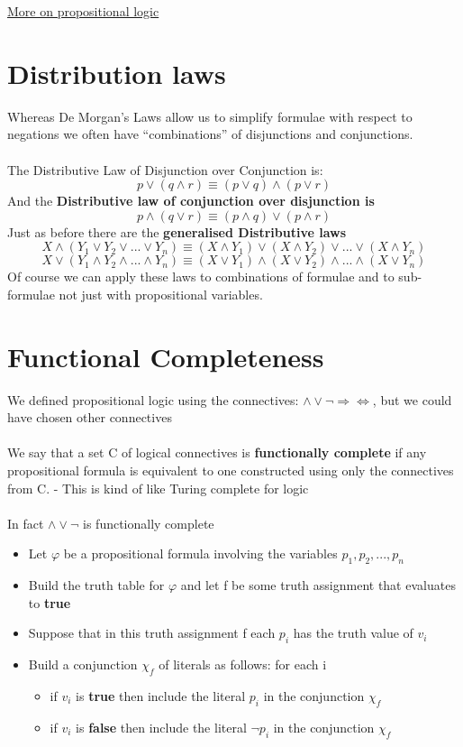 \documentclass{article}[18pt]
\begin{document}
\begin{center}
\underline{\huge More on propositional logic}
\end{center}
\section{Distribution laws}
Whereas De Morgan’s Laws allow us to simplify formulae with respect to negations we often have “combinations” of disjunctions and conjunctions.\\
\\
The Distributive Law of Disjunction over Conjunction is:\\
$$p\lor (q\land r)\equiv (p\lor q)\land (p\lor r)$$
And the \textbf{Distributive law of conjunction over disjunction is}
$$p\land(q\lor r)\equiv (p\land q)\lor (p\land r)$$
Just as before there are the \textbf{generalised Distributive laws}
$$X\land(Y_1\lor Y_2 \lor ... \lor Y_n)\equiv (X\land Y_1)\lor (X\land Y_2)\lor ... \lor (X\land Y_n)$$
$$X\lor (Y_1\land Y_2 \land ...\land Y_n)\equiv (X\lor Y_1)\land (X\lor Y_2)\land ... \land (X\lor Y_n)$$
Of course we can apply these laws to combinations of formulae and to sub-formulae not just with propositional variables. 
\section{Functional Completeness}
We defined propositional logic using the connectives: $\land \lor \lnot \Rightarrow \Leftrightarrow$, but we could have chosen other connectives\\
\\
We say that a set C of logical connectives is \textbf{functionally complete} if any propositional formula is equivalent to one constructed using only the connectives from C. - This is kind of like Turing complete for logic \\
\\
In fact $\land \lor\lnot$ is functionally complete
\begin{itemize}
\item Let $\varphi$ be a propositional formula involving the variables $p_1,p_2,...,p_n$
\item Build the truth table for $\varphi$ and let f be some truth assignment that evaluates to \textbf{true}
\item Suppose that in this truth assignment f each $p_i$ has the truth value of $v_i$
\item Build a conjunction $\chi_f$ of literals as follows: for each i
\begin{itemize}
\item if $v_i$ is \textbf{true} then include the literal $p_i$ in the conjunction $\chi_f$
\item if $v_i$ is \textbf{false} then include the literal $\lnot p_i$ in the conjunction $\chi_f$
\end{itemize}
\end{itemize}
\end{document}
